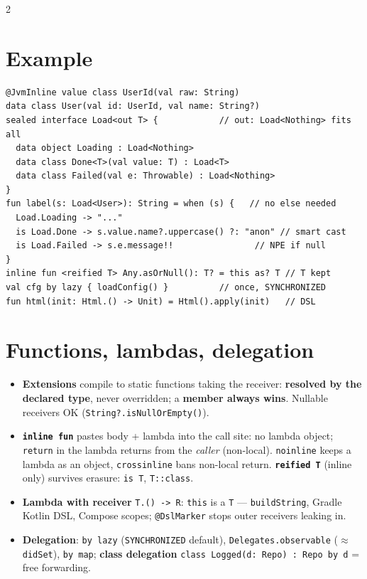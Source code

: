\documentclass[8pt]{extarticle}
\newcommand\ar{\texttt{\hbox{-}\hbox{>}}}
\begin{document}
\begin{multicols}{2}
\section{Example}
\begin{lstlisting}[language=KotlinSheet]
@JvmInline value class UserId(val raw: String)
data class User(val id: UserId, val name: String?)
sealed interface Load<out T> {            // out: Load<Nothing> fits all
  data object Loading : Load<Nothing>
  data class Done<T>(val value: T) : Load<T>
  data class Failed(val e: Throwable) : Load<Nothing>
}
fun label(s: Load<User>): String = when (s) {   // no else needed
  Load.Loading -> "..."
  is Load.Done -> s.value.name?.uppercase() ?: "anon" // smart cast
  is Load.Failed -> s.e.message!!                // NPE if null
}
inline fun <reified T> Any.asOrNull(): T? = this as? T // T kept
val cfg by lazy { loadConfig() }          // once, SYNCHRONIZED
fun html(init: Html.() -> Unit) = Html().apply(init)   // DSL
\end{lstlisting}

\columnbreak

\section{Functions, lambdas, delegation}
\begin{itemize}\raggedright
  \item \textbf{Extensions} compile to static functions taking the receiver:
        \textbf{resolved by the declared type}, never overridden; a \textbf{member always
        wins}. Nullable receivers OK (\texttt{String?.isNullOrEmpty()}).
  \item \textbf{\texttt{inline fun}} pastes body + lambda into the call site: no lambda
        object; \texttt{return} in the lambda returns from the \emph{caller} (non-local).
        \texttt{noinline} keeps a lambda as an object, \texttt{crossinline} bans non-local
        return. \textbf{\texttt{reified T}} (inline only) survives erasure: \texttt{is T},
        \texttt{T::class}.
  \item \textbf{Lambda with receiver} \texttt{T.() \ar{} R}: \texttt{this} is a \texttt{T} —
        \texttt{buildString}, Gradle Kotlin DSL, Compose scopes; \texttt{@DslMarker} stops
        outer receivers leaking in.
  \item \textbf{Delegation}: \texttt{by lazy} (\texttt{SYNCHRONIZED} default),
        \texttt{Delegates.observable} ($\approx$ \texttt{didSet}), \texttt{by map};
        \textbf{class delegation} \texttt{class Logged(d: Repo) : Repo by d} = free forwarding.
\end{itemize}


\end{multicols}
\end{document}
